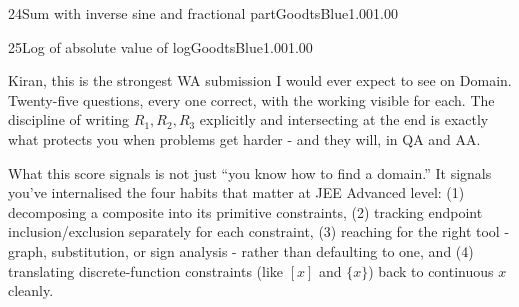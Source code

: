 \documentclass[11pt,a4paper]{article}
\begin{document}
\begin{tsQCard}{24}{Sum with inverse sine and fractional part}{Good}{tsBlue}{1.00}{1.00}
\end{tsQCard}

\begin{tsQCard}{25}{Log of absolute value of log}{Good}{tsBlue}{1.00}{1.00}
\end{tsQCard}



Kiran, this is the strongest WA submission I would ever expect to see on Domain. Twenty-five questions, every one correct, with the working visible for each. The discipline of writing $R_1, R_2, R_3$ explicitly and intersecting at the end is exactly what protects you when problems get harder - and they will, in QA and AA.

\par\vspace{0.2cm}
What this score signals is not just ``you know how to find a domain.'' It signals you've internalised the four habits that matter at JEE Advanced level: (1) decomposing a composite into its primitive constraints, (2) tracking endpoint inclusion/exclusion separately for each constraint, (3) reaching for the right tool - graph, substitution, or sign analysis - rather than defaulting to one, and (4) translating discrete-function constraints (like $[x]$ and $\{x\}$) back to continuous $x$ cleanly.
\end{document}
